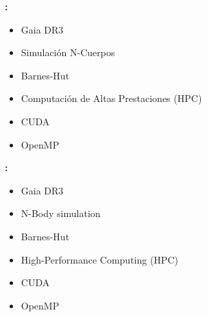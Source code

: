 \noindent
\begin{minipage}[t]{0.48\textwidth}
    \textbf{\palabraschaveprincipal:}
    \begin{itemize}[leftmargin=*, noitemsep]
        \item Gaia DR3
        \item Simulación N-Cuerpos
        \item Barnes-Hut
        \item Computación de Altas Prestaciones (HPC)
        \item CUDA
        \item OpenMP
    \end{itemize}
\end{minipage}
\hfill %
\begin{minipage}[t]{0.48\textwidth}
    \textbf{\palabraschavesecundaria:}
    \begin{itemize}[leftmargin=*, noitemsep]
        \item Gaia DR3
        \item N-Body simulation
        \item Barnes-Hut
        \item High-Performance Computing (HPC)
        \item CUDA
        \item OpenMP
    \end{itemize}
\end{minipage}


